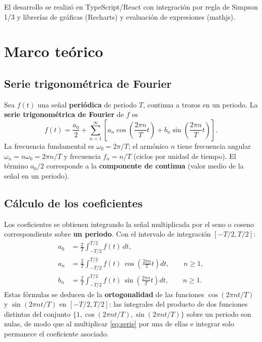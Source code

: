\documentclass[12pt,a4paper]{article}
\begin{document}
El desarrollo se realizó en TypeScript/React con integración por regla de Simpson 1/3 y librerías de gráficas (Recharts) y evaluación de expresiones (mathjs).

\section{Marco teórico}

\subsection{Serie trigonométrica de Fourier}

Sea \(f(t)\) una señal \textbf{periódica} de periodo \(T\), continua a trozos en un periodo. La \textbf{serie trigonométrica de Fourier} de \(f\) es
\begin{equation}
  f(t) = \frac{a_0}{2} + \sum_{n=1}^{\infty} \left[ a_n \cos\left(\frac{2\pi n}{T}t\right) + b_n \sin\left(\frac{2\pi n}{T}t\right) \right].
  \label{eq:serie}
\end{equation}
La frecuencia fundamental es \(\omega_0 = 2\pi/T\); el armónico \(n\) tiene frecuencia angular \(\omega_n = n\omega_0 = 2\pi n/T\) y frecuencia \(f_n = n/T\) (ciclos por unidad de tiempo). El término \(a_0/2\) corresponde a la \textbf{componente de continua} (valor medio de la señal en un periodo).

\subsection{Cálculo de los coeficientes}

Los coeficientes se obtienen integrando la señal multiplicada por el seno o coseno correspondiente sobre \textbf{un periodo}. Con el intervalo de integración \([-T/2, T/2]\):
\begin{align}
  a_0 &= \frac{2}{T} \int_{-T/2}^{T/2} f(t)\,dt, \\
  a_n &= \frac{2}{T} \int_{-T/2}^{T/2} f(t)\,\cos\left(\frac{2\pi n}{T}t\right)dt, \qquad n \geq 1, \\
  b_n &= \frac{2}{T} \int_{-T/2}^{T/2} f(t)\,\sin\left(\frac{2\pi n}{T}t\right)dt, \qquad n \geq 1.
\end{align}
Estas fórmulas se deducen de la \textbf{ortogonalidad} de las funciones \(\cos(2\pi n t/T)\) y \(\sin(2\pi n t/T)\) en \([-T/2, T/2]\): las integrales del producto de dos funciones distintas del conjunto \(\{1, \cos(2\pi n t/T), \sin(2\pi n t/T)\}\) sobre un periodo son nulas, de modo que al multiplicar \eqref{eq:serie} por una de ellas e integrar solo permanece el coeficiente asociado.
\end{document}
